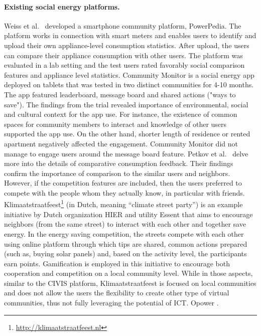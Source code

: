 \paragraph{Existing social energy platforms.} Weiss et al.~\cite{weiss2012powerpedia} developed a smartphone community platform, PowerPedia. The platform works in connection with smart meters and enables users to identify and upload their own appliance-level consumption statistics. After upload, the users can compare their appliance consumption with other users. The platform was evaluated in a lab setting and the test users rated favorably social comparison features and appliance level statistics. Community Monitor \cite{dillahunt2014understanding} is a social energy app deployed on tablets that was tested in two distinct communities for 4-10 months. The app featured leaderboard, message board and shared actions ("ways to save"). The findings from the trial revealed importance of environmental, social and cultural context for the app use. For instance, the existence of common spaces for community members to interact and knowledge of other users supported the app use. On the other hand, shorter length of residence or rented apartment negatively affected the engagement. Community Monitor did not manage to engage users around the message board feature. Petkov et al.~\cite{petkov2011motivating} delve more into the details of comparative consumption feedback. Their findings confirm the importance of comparison to the similar users and neighbors. However, if the competition features are included, then the users preferred to compete with the people whom they actually know, in particular with friends.
Klimaatstraatfeest\footnote{\url{http://klimaatstraatfeest.nl}} (in Dutch, meaning “climate street party”) is an example initiative by Dutch organization HIER and utility Essent that aims to encourage neighbors (from the same street) to interact with each other and together save energy. In the energy saving competition, the streets compete with each other using online platform through which tips are shared, common actions prepared (such as, buying solar panels) and, based on the activity level, the participants earn points. Gamification is employed in this initiative to encourage both cooperation and competition on a local community level. While in those aspects, similar to the CIVIS platform, Klimaatstraatfeest is focused on local communities and does not allow the users the flexibility to create other type of virtual communities, thus not fully leveraging the potential of ICT.
Opower \cite{allcott2011social}.

